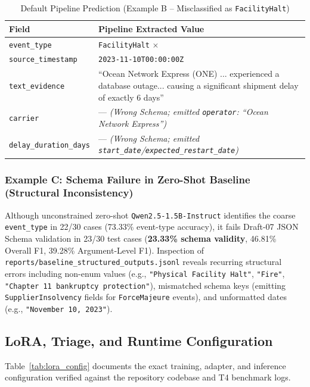 \documentclass[11pt,a4paper]{article}
\begin{document}
\begin{table}[htbp]
\centering
\caption{Default Pipeline Prediction (Example B -- Misclassified as \texttt{FacilityHalt})}
\label{tab:ex_b_pred}
\begin{tabular}{@{}p{3.8cm} p{8.7cm}@{}}
\toprule
\textbf{Field} & \textbf{Pipeline Extracted Value} \\
\midrule
\texttt{event\_type} & \texttt{FacilityHalt} $\times$ \\
\texttt{source\_timestamp} & \texttt{2023-11-10T00:00:00Z} \\
\texttt{text\_evidence} & ``Ocean Network Express (ONE) ... experienced a database outage... causing a significant shipment delay of exactly 6 days'' \\
\texttt{carrier} & --- \textit{(Wrong Schema; emitted \texttt{operator}: ``Ocean Network Express'')} \\
\texttt{delay\_duration\_days} & --- \textit{(Wrong Schema; emitted \texttt{start\_date}/\texttt{expected\_restart\_date})} \\
\bottomrule
\end{tabular}
\end{table}

\subsubsection*{Example C: Schema Failure in Zero-Shot Baseline (Structural Inconsistency)}
Although unconstrained zero-shot \texttt{Qwen2.5-1.5B-Instruct} identifies the coarse \texttt{event\_type} in 22/30 cases (73.33\% event-type accuracy), it fails Draft-07 JSON Schema validation in 23/30 test cases (\textbf{23.33\% schema validity}, 46.81\% Overall F1, 39.28\% Argument-Level F1). Inspection of \texttt{reports/baseline\_structured\_outputs.jsonl} reveals recurring structural errors including non-enum values (e.g., \texttt{"Physical Facility Halt"}, \texttt{"Fire"}, \texttt{"Chapter 11 bankruptcy protection"}), mismatched schema keys (emitting \texttt{SupplierInsolvency} fields for \texttt{ForceMajeure} events), and unformatted dates (e.g., \texttt{"November 10, 2023"}).

\clearpage
\subsection{LoRA, Triage, and Runtime Configuration}
Table~\ref{tab:lora_config} documents the exact training, adapter, and inference configuration verified against the repository codebase and T4 benchmark logs.
\end{document}
